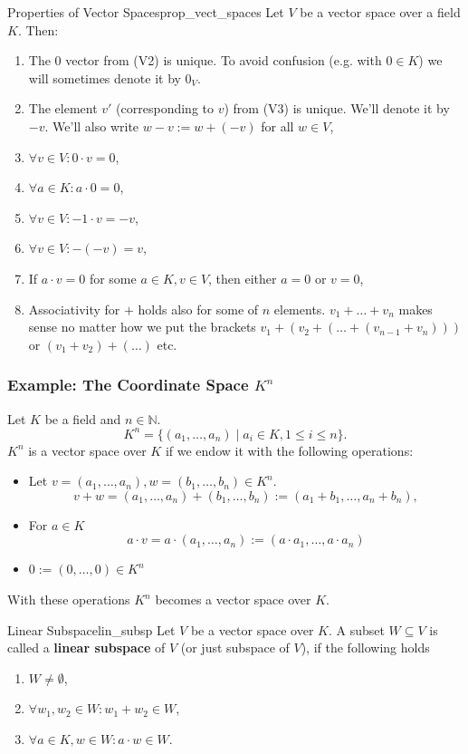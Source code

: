 \begin{lemma}{Properties of Vector Spaces}{prop_vect_spaces}
	Let $V$ be a vector space over a field $K$. Then:
	\begin{enumerate}
		\item[(a)] The $0$ vector from (V2) is unique. To avoid confusion (e.g. with $0 \in K$) we will sometimes denote it by $0_{V}$.
		\item[(b)] The element $v'$ (corresponding to $v$) from (V3) is unique. We'll denote it by $-v$. We'll also write $w - v := w + (-v)$ for all $w \in V$,
		\item[(c)] $\forall v \in V : 0 \cdot v = 0$,
		\item[(d)] $\forall a \in K : a \cdot 0 = 0$,
		\item[(e)] $\forall v \in V : -1 \cdot v = -v$,
		\item[(f)] $\forall v \in V : -(-v) = v$,
		\item[(g)] If $a \cdot v = 0$ for some $a \in K, v \in V$, then either $a = 0$ or $v = 0$,
		\item[(h)] Associativity for $+$ holds also for some of $n$ elements. $v_1 + \hdots + v_n$ makes sense no matter how we put the brackets $v_1 + (v_2 + (\hdots + (v_{n-1} + v_n)))$ or $(v_1 + v_2) + (\hdots)$ etc.
	\end{enumerate}
\end{lemma}

\subsubsection*{Example: The Coordinate Space $K^n$}
Let $K$ be a field and $n \in \mathbb{N}$.
\[
	K^n = \{(a_1, \hdots , a_n)\; |\; a_i \in K, 1 \leq i \leq n\}.
\]
$K^n$ is a vector space over $K$ if we endow it with the following operations:
\begin{itemize}
	\item[$\bullet$] Let $v = (a_1, \hdots , a_n), w = (b_1, \hdots , b_n) \in K^n$.
	\[
		v + w = (a_1, \hdots , a_n) + (b_1, \hdots , b_n) := (a_1 + b_1, \hdots , a_n + b_n),
	\]
	\item[$\bullet$] For $a \in K$
	\[
		a\cdot v = a\cdot (a_1, \hdots , a_n) := (a\cdot a_1, \hdots , a\cdot a_n)
	\]
	\item[$\bullet$] $0 := (0, \hdots , 0) \in K^n$
\end{itemize}
With these operations $K^n$ becomes a vector space over $K$.

\begin{definition}{Linear Subspace}{lin_subsp}
	Let $V$ be a vector space over $K$. A subset $W \subseteq V$ is called a \textbf{linear subspace} of $V$ (or just subspace of $V$), if the following holds
	\begin{enumerate}
		\item[(LSS1)] $W \neq \emptyset$,
		\item[(LSS2)] $\forall w_1, w_2 \in W : w_1 + w_2 \in W$,
		\item[(LSS3)] $\forall a \in K, w \in W : a\cdot w \in W$.
	\end{enumerate}
\end{definition}

